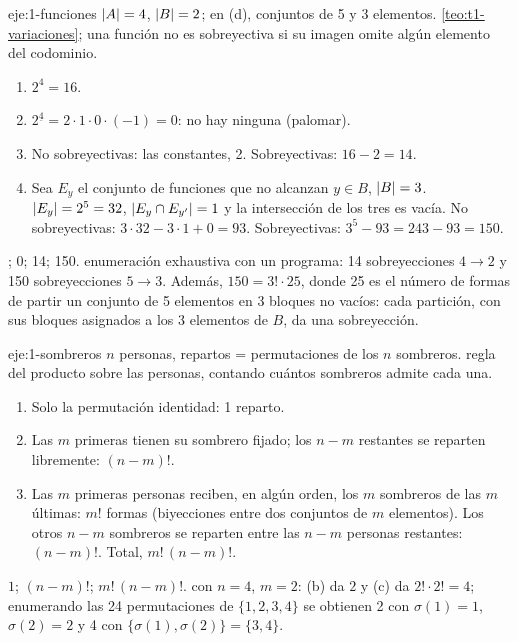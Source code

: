 \begin{solucion}{eje:1-funciones}
\datos $\lvert A\rvert=4$, $\lvert B\rvert=2$; en (d), conjuntos de 5 y 3 elementos.
\planteamiento \cref{teo:t1-variaciones}; una función no es sobreyectiva si su imagen omite algún elemento del codominio.
\pasos
\begin{enumerate}[label=(\alph*)]
  \item $2^{4}=16$.
  \item $2^{\underline4}=2\cdot1\cdot0\cdot(-1)=0$: no hay ninguna (palomar).
  \item No sobreyectivas: las constantes, 2. Sobreyectivas: $16-2=14$.
  \item Sea $E_y$ el conjunto de funciones que no alcanzan $y\in B$, $\lvert B\rvert=3$. $\lvert E_y\rvert=2^{5}=32$, $\lvert E_y\cap E_{y'}\rvert=1$ y la intersección de los tres es vacía. No sobreyectivas: $3\cdot32-3\cdot1+0=93$. Sobreyectivas: $3^{5}-93=243-93=150$.
\end{enumerate}
; 0; 14; 150.
\comprobacion enumeración exhaustiva con un programa: 14 sobreyecciones $4\to2$ y 150 sobreyecciones $5\to3$. Además, $150=3!\cdot25$, donde 25 es el número de formas de partir un conjunto de 5 elementos en 3 bloques no vacíos: cada partición, con sus bloques asignados a los 3 elementos de $B$, da una sobreyección.
\end{solucion}

\begin{solucion}{eje:1-sombreros}
\datos $n$ personas, repartos = permutaciones de los $n$ sombreros.
\planteamiento regla del producto sobre las personas, contando cuántos sombreros admite cada una.
\pasos
\begin{enumerate}[label=(\alph*)]
  \item Solo la permutación identidad: 1 reparto.
  \item Las $m$ primeras tienen su sombrero fijado; los $n-m$ restantes se reparten libremente: $(n-m)!$.
  \item Las $m$ primeras personas reciben, en algún orden, los $m$ sombreros de las $m$ últimas: $m!$ formas (biyecciones entre dos conjuntos de $m$ elementos). Los otros $n-m$ sombreros se reparten entre las $n-m$ personas restantes: $(n-m)!$. Total, $m!\,(n-m)!$.
\end{enumerate}
\resultado $1$; $(n-m)!$; $m!\,(n-m)!$.
\comprobacion con $n=4$, $m=2$: (b) da $2$ y (c) da $2!\cdot2!=4$; enumerando las 24 permutaciones de $\{1,2,3,4\}$ se obtienen 2 con $\sigma(1)=1$, $\sigma(2)=2$ y 4 con $\{\sigma(1),\sigma(2)\}=\{3,4\}$.
\end{solucion}

